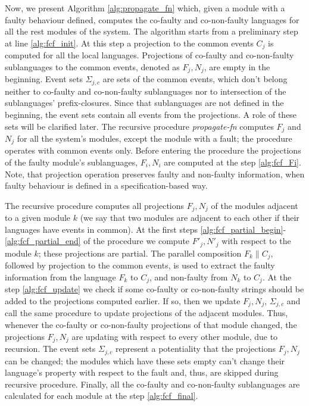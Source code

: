Now, we present Algorithm \ref{alg:propagate_fn} which, given a module with a
faulty behaviour defined, computes the co-faulty and co-non-faulty languages for
all the rest modules of the system.
The algorithm starts from a preliminary step at line \ref{alg:fcf_init}.
At this step a projection to the common events $C_j$ is computed for all the
local languages. Projections of co-faulty and co-non-faulty sublanguages to the
common events, denoted as $F_j, N_j$, are empty in the beginning. Event sets
$\Sigma_{j,c}$ are sets of the common events, which don't belong neither to
co-faulty and co-non-faulty sublanguages nor to intersection of the
sublanguages' prefix-closures. Since that sublanguages are not defined in the
beginning, the event sets contain all events from the projections. A role of
these sets will be clarified later.
The recursive procedure \emph{propagate-fn} computes $F_j$ and $N_j$ for all the
system's modules, except the module with a fault; the procedure operates with
common events only. Before entering the procedure the projections of the faulty
module's sublanguages, $F_i, N_i$ are computed at the step \ref{alg:fcf_Fi}.
Note, that projection operation preserves faulty and non-faulty information,
when faulty behaviour is defined in a specification-based way.

The recursive procedure computes all projections $F_j, N_j$ of the modules
adjacent to a given module $k$ (we say that two modules are adjacent to each
other if their languages have events in common). At the first steps
\ref{alg:fcf_partial_begin}-\ref{alg:fcf_partial_end} of the procedure we
compute $F'_j, N'_j$ with respect to the module $k$; these projections are
partial. The parallel composition $F_k \parallel C_j$, followed by projection to
the common events, is used to extract the faulty information from the
language $F_k$ to $C_j$, and non-faulty from $N_k$ to $C_j$. At the step
\ref{alg:fcf_update} we check if some co-faulty or co-non-faulty strings should be added to the projections computed earlier. If so, then we update $F_j, N_j$, $\Sigma_{j,c}$ and call the same procedure to update projections of the adjacent modules. Thus, whenever the co-faulty or
co-non-faulty projections of that module changed, the projections $F_j, N_j$ are
updating with respect to every other module, due to recursion. The event sets
$\Sigma_{j,c}$ represent a potentiality that the projections $F_j, N_j$ can be
changed; the modules which have these sets empty can't change their language's
property with respect to the fault and, thus, are skipped during recursive
procedure. Finally, all the co-faulty and co-non-faulty sublanguages are
calculated for each module at the step \ref{alg:fcf_final}.



